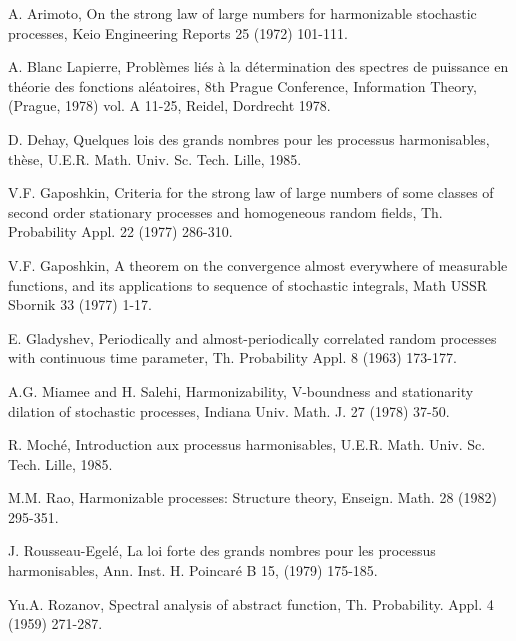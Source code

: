 \documentclass{article}
\theoremstyle{definition}
\begin{document}
\begin{thebibliography}{99}

 A. Arimoto, On the strong law of large numbers for harmonizable stochastic processes, Keio Engineering Reports 25 (1972) 101-111.

 A. Blanc Lapierre, Problèmes liés à la détermination des spectres de puissance en théorie des fonctions aléatoires, 8th Prague Conference, Information Theory, (Prague, 1978) vol. A 11-25, Reidel, Dordrecht 1978.

 D. Dehay, Quelques lois des grands nombres pour les processus harmonisables, thèse, U.E.R. Math. Univ. Sc. Tech. Lille, 1985.

 V.F. Gaposhkin, Criteria for the strong law of large numbers of some classes of second order stationary processes and homogeneous random fields, Th. Probability Appl. 22 (1977) 286-310.

 V.F. Gaposhkin, A theorem on the convergence almost everywhere of measurable functions, and its applications to sequence of stochastic integrals, Math USSR Sbornik 33 (1977) 1-17.

 E. Gladyshev, Periodically and almost-periodically correlated random processes with continuous time parameter, Th. Probability Appl. 8 (1963) 173-177.

 A.G. Miamee and H. Salehi, Harmonizability, V-boundness and stationarity dilation of stochastic processes, Indiana Univ. Math. J. 27 (1978) 37-50.

 R. Moché, Introduction aux processus harmonisables, U.E.R. Math. Univ. Sc. Tech. Lille, 1985.

 M.M. Rao, Harmonizable processes: Structure theory, Enseign. Math. 28 (1982) 295-351.

 J. Rousseau-Egelé, La loi forte des grands nombres pour les processus harmonisables, Ann. Inst. H. Poincaré B 15, (1979) 175-185.

 Yu.A. Rozanov, Spectral analysis of abstract function, Th. Probability. Appl. 4 (1959) 271-287.

\end{thebibliography}
\end{document}

